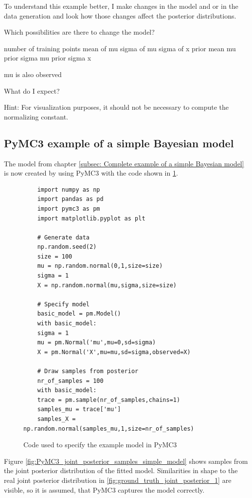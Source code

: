 \documentclass{article}
\begin{document}
To understand this example better, I make changes in the model and or in the data generation and look how those changes affect the posterior distributions. 

Which possibilities are there to change the model? 

number of training points
mean of mu
sigma of mu
sigma of x
prior mean mu
prior sigma mu
prior sigma x

mu is also observed


What do I expect? 


Hint: For visualization purposes, it should not be necessary to compute the normalizing constant.

\subsection{PyMC3 example of a simple Bayesian model}
\label{subsec: PyMC3 example of a simple Bayesian model}
The model from chapter \autoref{subsec: Complete example of a simple Bayesian model} is now created by using PyMC3 with the code shown in \ref{fig:PyMC3_example_code_simple_model}.
\begin{figure}[h]
	\begin{lstlisting}
	import numpy as np
	import pandas as pd
	import pymc3 as pm
	import matplotlib.pyplot as plt
	
	# Generate data
	np.random.seed(2)
	size = 100
	mu = np.random.normal(0,1,size=size)
	sigma = 1
	X = np.random.normal(mu,sigma,size=size)

	# Specify model
	basic_model = pm.Model()
	with basic_model:
	sigma = 1
	mu = pm.Normal('mu',mu=0,sd=sigma)
	X = pm.Normal('X',mu=mu,sd=sigma,observed=X)

	# Draw samples from posterior
	nr_of_samples = 100
	with basic_model:
	trace = pm.sample(nr_of_samples,chains=1)
	samples_mu = trace['mu']
	samples_X = np.random.normal(samples_mu,1,size=nr_of_samples)
	\end{lstlisting}
	\label{fig:PyMC3_example_code_simple_model}
	\caption[Code used to specify the example model in PyMC3]{Code used to specify the example model in PyMC3}
\end{figure}
Figure \ref{fig:PyMC3_joint_posterior_samples_simple_model} shows samples from the joint posterior distribution of the fitted model. Similarities in shape to the real joint posterior distribution in \ref{fig:ground_truth_joint_posterior_1} are visible, so it is assumed, that PyMC3 captures the model correctly.
\end{document}
